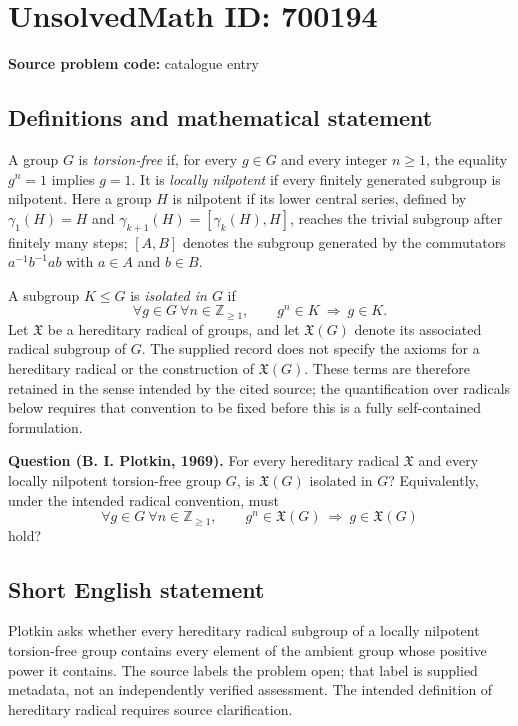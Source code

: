 \documentclass[11pt]{article}
\newcommand{\Z}{\mathbb{Z}}
\begin{document}
\section*{UnsolvedMath ID: 700194}
\textbf{Source problem code:} catalogue entry
\subsection{Definitions and mathematical statement}
A group \(G\) is \emph{torsion-free} if, for every \(g\in G\) and every integer \(n\geq 1\), the equality \(g^n=1\) implies \(g=1\). It is \emph{locally nilpotent} if every finitely generated subgroup is nilpotent. Here a group \(H\) is nilpotent if its lower central series, defined by \(\gamma_1(H)=H\) and \(\gamma_{k+1}(H)=[\gamma_k(H),H]\), reaches the trivial subgroup after finitely many steps; \([A,B]\) denotes the subgroup generated by the commutators \(a^{-1}b^{-1}ab\) with \(a\in A\) and \(b\in B\).

A subgroup \(K\leq G\) is \emph{isolated in \(G\)} if
\[
\forall g\in G\ \forall n\in\Z_{\geq 1},\qquad g^n\in K\ \Longrightarrow\ g\in K.
\]
Let \(\mathfrak{X}\) be a hereditary radical of groups, and let \(\mathfrak{X}(G)\) denote its associated radical subgroup of \(G\). The supplied record does not specify the axioms for a hereditary radical or the construction of \(\mathfrak{X}(G)\). These terms are therefore retained in the sense intended by the cited source; the quantification over radicals below requires that convention to be fixed before this is a fully self-contained formulation.

\textbf{Question (B. I. Plotkin, 1969).} For every hereditary radical \(\mathfrak{X}\) and every locally nilpotent torsion-free group \(G\), is \(\mathfrak{X}(G)\) isolated in \(G\)? Equivalently, under the intended radical convention, must
\[
\forall g\in G\ \forall n\in\Z_{\geq 1},\qquad
 g^n\in\mathfrak{X}(G)\ \Longrightarrow\ g\in\mathfrak{X}(G)
\]
hold?
\subsection{Short English statement}
Plotkin asks whether every hereditary radical subgroup of a locally nilpotent torsion-free group contains every element of the ambient group whose positive power it contains. The source labels the problem open; that label is supplied metadata, not an independently verified assessment. The intended definition of hereditary radical requires source clarification.
\end{document}
